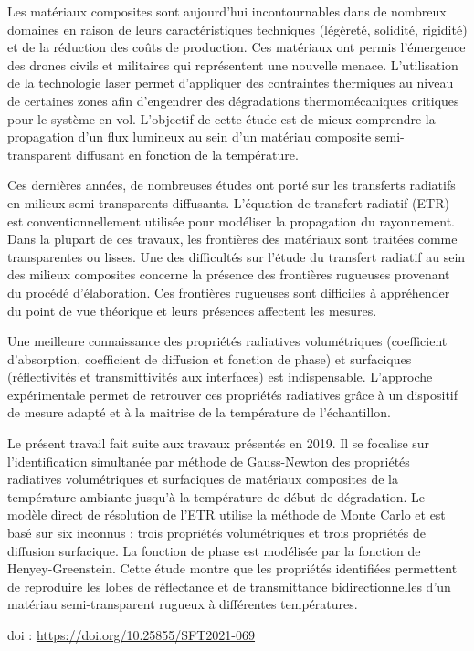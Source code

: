 {\normalsize
Les matériaux composites sont aujourd'hui incontournables dans de nombreux domaines en raison de leurs caractéristiques techniques (légèreté, solidité, rigidité) et de la réduction des coûts de production. Ces matériaux ont permis l'émergence des drones civils et militaires qui représentent une nouvelle menace. L'utilisation de la technologie laser permet d'appliquer des contraintes thermiques au niveau de certaines zones afin d'engendrer des dégradations thermomécaniques critiques pour le système en vol. L'objectif de cette étude est de mieux comprendre la propagation d'un flux lumineux au sein d'un matériau composite semi-transparent diffusant en fonction de la température.



Ces dernières années, de nombreuses études ont porté sur les transferts radiatifs en milieux semi-transparents diffusants. L'équation de transfert radiatif (ETR) est conventionnellement utilisée pour modéliser la propagation du rayonnement. Dans la plupart de ces travaux, les frontières des matériaux sont traitées comme transparentes ou lisses. Une des difficultés sur l'étude du transfert radiatif au sein des milieux composites concerne la présence des frontières rugueuses provenant du procédé d'élaboration. Ces frontières rugueuses sont difficiles à appréhender du point de vue théorique et leurs présences affectent les mesures. 



Une meilleure connaissance des propriétés radiatives volumétriques (coefficient d'absorption, coefficient de diffusion et fonction de phase) et surfaciques (réflectivités et transmittivités aux interfaces) est indispensable. L'approche expérimentale permet de retrouver ces propriétés radiatives grâce à un dispositif de mesure adapté et à la maitrise de la température de l'échantillon.



Le présent travail fait suite aux travaux présentés en 2019. Il se focalise sur l'identification simultanée par méthode de Gauss-Newton des propriétés radiatives volumétriques et surfaciques de matériaux composites de la température ambiante jusqu'à la température de début de dégradation. Le modèle direct de résolution de l'ETR utilise la méthode de Monte Carlo et est basé sur six inconnus : trois propriétés volumétriques et trois propriétés de diffusion surfacique. La fonction de phase est modélisée par la fonction de Henyey-Greenstein. Cette étude montre que les propriétés identifiées permettent de reproduire les lobes de réflectance et de transmittance bidirectionnelles d'un matériau semi-transparent rugueux à différentes températures.

 \vfill doi : \url{https://doi.org/10.25855/SFT2021-069}

}
 

